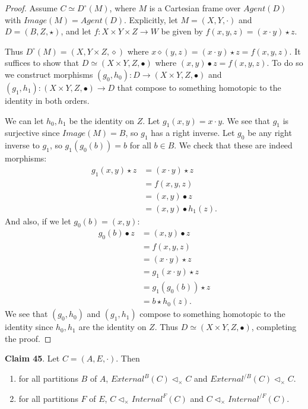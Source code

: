 \documentclass{article}
\begin{document}
\begin{proof}
Assume $C \simeq D^{\circ}(M)$, where $M$ is a Cartesian frame over $Agent(D)$ with $Image(M) = Agent(D)$.
Explicitly, let $M = (X, Y, \cdot)$ and $D = (B, Z, \star)$, and let $f : X \times Y \times Z \to W$ be given by $f(x, y, z) = (x \cdot y) \star z$.

Thus $D^{\circ}(M) = (X, Y \times Z, \diamond)$ where $x \diamond (y, z) = (x \cdot y) \star z = f(x, y, z)$.
It suffices to show that $D \simeq (X \times Y, Z, \bullet)$ where $(x, y) \bullet z = f(x, y, z)$.
To do so we construct morphisms $(g_0, h_0) : D \to (X \times Y, Z, \bullet)$ and $(g_1, h_1) : (X \times Y, Z, \bullet) \to D$ that compose to something homotopic to the identity in both orders.

We can let $h_0, h_1$ be the identity on $Z$.
Let $g_1(x, y) = x \cdot y$.
We see that $g_1$ is surjective since $Image(M) = B$, so $g_1$ has a right inverse.
Let $g_0$ be any right inverse to $g_1$, so $g_1(g_0(b))=b$ for all $b \in B$.
We check that these are indeed morphisms:
\[
\begin{split}
    g_1(x, y) \star z & = (x \cdot y) \star z \\
                      & = f(x, y, z) \\
                      & = (x, y) \bullet z \\
                      & = (x, y) \bullet h_1(z).
\end{split}
\]
And also, if we let $g_0(b) = (x, y)$:
\[
\begin{split}
    g_0(b) \bullet z & = (x, y) \bullet z \\
                     & = f(x, y, z) \\
                     & = (x \cdot y) \star z \\
                     & = g_1(x \cdot y) \star z \\
                     & = g_1(g_0(b)) \star z \\
                     & = b \star h_0(z).
\end{split}
\]
We see that $(g_0, h_0)$ and $(g_1, h_1)$ compose to something homotopic to the identity since $h_0, h_1$ are the identity on $Z$.
Thus $D \simeq (X \times Y, Z, \bullet)$, completing the proof.
\end{proof}

\noindent \textbf{Claim 45}. Let $C=(A, E, \cdot)$. Then
\begin{enumerate}[label=(\arabic*)]
    \item for all partitions $B$ of $A$, $External^B (C) \triangleleft_{\times} C$ and $External^{/B} (C) \triangleleft_{\times} C$.
    \item for all partitions $F$ of $E$, $C \triangleleft_{\times} Internal^F (C)$ and $C \triangleleft_{\times} Internal^{/F} (C)$.
\end{enumerate}
\end{document}
